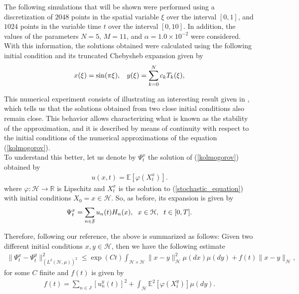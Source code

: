     The following simulations that will be shown were performed using a discretization of $2048$ points in the spatial variable $\xi$ over the interval $[0, 1]$, and $1024$ points in the variable time $t$ over the interval $[0, 10]$. In addition, the values of the parameters $N = 5$, $M = 11$, and $\alpha = 1.0 \times 10^{-2}$ were considered. With this information, the solutions obtained were calculated using the following initial condition and its truncated Chebysheb expansion given by
    \begin{align*}
    	x(\xi) = \sin(\pi \xi), \hspace{3mm} y(\xi) = \displaystyle \sum^{N}_{k=0} c_k T_k (\xi),
    \end{align*}
    
    This numerical experiment consists of illustrating an interesting result given in \cite{Delgado2019}, which tells us that the solutions obtained from two close initial conditions also remain close. This behavior allows characterizing what is known as the stability of the approximation, and it is described by means of continuity with respect to the initial conditions of the numerical approximations of the equation (\ref{kolmogorov}). \\
    
    To understand this better, let us denote by $\Psi^{x}_t$ the solution of (\ref{kolmogorov}) obtained by
    \begin{align*}
    	u(x, t) = \mathbb{E} \left[ \varphi (X^x_t) \right]. 
    \end{align*}
    where $\varphi: \mathcal{H} \rightarrow \mathbb{R}$ is Lipschitz and $X^x_t$ is the solution to (\ref{stochastic_equation}) with initial conditions $X_0 = x \in \mathcal{H}$. So, as before, its expansion is given by
    \begin{align*}
    	\Psi^{x}_t = \displaystyle \sum _{n \in \mathcal{J}} u_n (t) H_n (x), \hspace{2mm} x \in \mathcal{H}, \hspace{2mm} t \in [0, T].
    \end{align*}
    
    Therefore, following our reference, the above is summarized as follows: Given two different initial conditions $x, y \in \mathcal{H}$, then we have the following estimate
	\begin{align*}
		\| \Psi^x_t - \Psi^y_t \|^2_{\left( L^2 (\mathcal{H}, \mu)\right)^2} \leq \exp(Ct) \displaystyle \int_{\mathcal{H} \times \mathcal{H}} \|x - y \|^2_{\mathcal{H}} \mu (dx) \mu (dy) + f(t) \|x - y\|_{\mathcal{H}},
	\end{align*}
	for some $C$ finite and $f(t)$ is given by
	\begin{align*}
		f(t) = \displaystyle \sum_{n \in J} \left[u^y_n (t)\right]^2 + \int_{\mathcal{H}} \mathbb{E}^2 \left[\varphi (X^y_t)\right] \mu (dy).
	\end{align*}	
	
